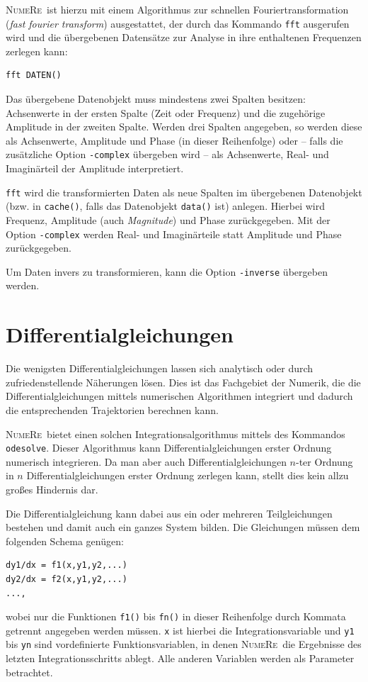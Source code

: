 \documentclass[DIV=14,headsepline,footsepline]{scrbook}
\newcommand{\NR}{\textsc{Nu\-me\-Re}}
\begin{document}
				\NR\ ist hierzu mit einem Algorithmus zur schnellen Fouriertransformation (\emph{fast fourier transform}) ausgestattet, der durch das Kommando \lstinline+fft+ ausgerufen wird und die übergebenen Datensätze zur Analyse in ihre enthaltenen Frequenzen zerlegen kann:
				\begin{lstlisting}
fft DATEN()
				\end{lstlisting}
				Das übergebene Datenobjekt muss mindestens zwei Spalten besitzen: Achsenwerte in der ersten Spalte (Zeit oder Frequenz) und die zugehörige Amplitude in der zweiten Spalte. Werden drei Spalten angegeben, so werden diese als Achsenwerte, Amplitude und Phase (in dieser Reihenfolge) oder -- falls die zusätzliche Option \lstinline+-complex+ übergeben wird -- als Achsenwerte, Real- und Imaginärteil der Amplitude interpretiert.
				
				\lstinline+fft+ wird die transformierten Daten als neue Spalten im übergebenen Datenobjekt (bzw. in \lstinline+cache()+, falls das Datenobjekt \lstinline+data()+ ist) anlegen. Hierbei wird Frequenz, Amplitude (auch \emph{Magnitude}) und Phase zurückgegeben. Mit der Option \lstinline+-complex+ werden Real- und Imaginärteile statt Amplitude und Phase zurückgegeben.
				
				Um Daten invers zu transformieren, kann die Option \lstinline+-inverse+ übergeben werden.
				
			\section{Differentialgleichungen}
				Die wenigsten Differentialgleichungen lassen sich analytisch oder durch zufriedenstellende Näherungen lösen. Dies ist das Fachgebiet der Numerik, die die Differentialgleichungen mittels numerischen Algorithmen integriert und dadurch die entsprechenden Trajektorien berechnen kann.
				
				\NR\ bietet einen solchen Integrationsalgorithmus mittels des Kommandos \lstinline+odesolve+. Dieser Algorithmus kann Differentialgleichungen erster Ordnung numerisch integrieren. Da man aber auch Differentialgleichungen $n$-ter Ordnung in $n$ Differentialgleichungen erster Ordnung zerlegen kann, stellt dies kein allzu großes Hindernis dar.
				
				Die Differentialgleichung kann dabei aus ein oder mehreren Teilgleichungen bestehen und damit auch ein ganzes System bilden. Die Gleichungen müssen dem folgenden Schema genügen:
				\begin{lstlisting}
dy1/dx = f1(x,y1,y2,...)
dy2/dx = f2(x,y1,y2,...)
...,				
				\end{lstlisting}
				wobei nur die Funktionen \lstinline+f1()+ bis \lstinline+fn()+ in dieser Reihenfolge durch Kommata getrennt angegeben werden müssen. \lstinline+x+ ist hierbei die Integrationsvariable und \lstinline+y1+ bis \lstinline+yn+ sind vordefinierte Funktionsvariablen, in denen \NR\ die Ergebnisse des letzten Integrationsschritts ablegt. Alle anderen Variablen werden als Parameter betrachtet.
	
\end{document}
